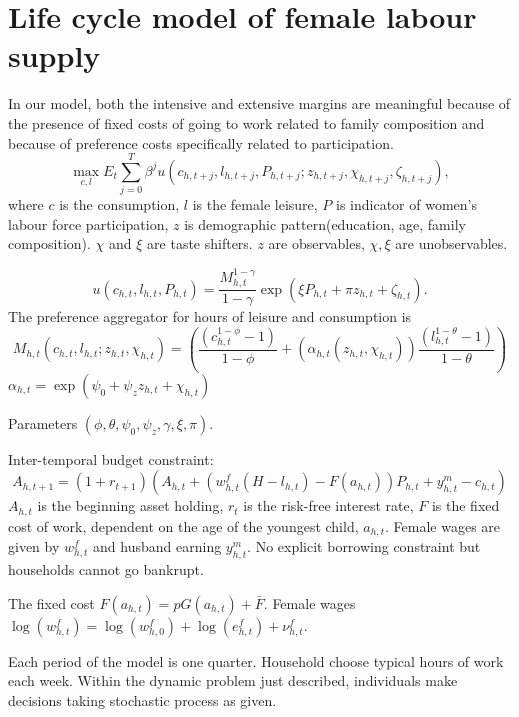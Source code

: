 \section{Life cycle model of female labour supply}
In our model, both the intensive and extensive margins are meaningful because of the presence of fixed costs of going to work related to family composition and because of preference costs specifically related to participation.
\[ \max_{c,l} E_t \sum_{j=0}^T \beta^j u(c_{h,t+j},l_{h,t+j},P_{h,t+j};z_{h,t+j},\chi_{h,t+j},\zeta_{h,t+j}), \]
where $c$ is the consumption, $l$ is the female leisure, $P$ is indicator of women's labour force participation, $z$ is demographic pattern(education, age, family composition). $\chi$ and $\xi$ are taste shifters.
$z$ are observables, $\chi,\xi$ are unobservables.

\[ u(c_{h,t},l_{h,t},P_{h,t}) = \frac{M^{1-\gamma}_{h,t}}{1 - \gamma} \exp{(\xi P_{h,t} + \pi z_{h,t} + \zeta_{h,t} )} .\]
The preference aggregator for hours of leisure and consumption is 
\[ M_{h,t}(c_{h,t},l_{h,t};z_{h,t},\chi_{h,t}) = \left( \frac{(c_{h,t}^{1 - \phi} - 1)}{1 - \phi} + (\alpha_{h,t}(z_{h,t},\chi_{h,t})) \frac{(l_{h,t}^{1 - \theta} -1)}{ 1 - \theta}\right) \]
$\alpha_{h,t}= \exp{(\psi_0 + \psi_z z_{h,t} + \chi_{h,t})}$

Parameters  $(\phi,\theta,\psi_0,\psi_z,\gamma,\xi,\pi)$.

Inter-temporal budget constraint:
\[ A_{h,t+1} = (1 + r_{t+1}) \left( A_{h,t} + \left(w_{h,t}^f(H-l_{h,t}) - F(a_{h,t}) \right)P_{h,t} + y_{h,t}^m - c_{h,t} \right)\]
$A_{h,t}$ is the beginning asset holding, $r_t$ is the risk-free interest rate, $F$ is the fixed cost of work, dependent on the age of the youngest child, $a_{h,t}$. Female wages are given by $w_{h,t}^f$ and husband earning $y_{h,t}^m$.
No explicit borrowing constraint but households cannot go bankrupt.

The fixed cost $F(a_{h,t}) = p G(a_{h,t}) + \bar{F}$.
Female wages $\log(w_{h,t}^f ) = \log(w_{h,0}^f) + \log(e_{h,t}^f) + \nu_{h,t}^f $.

Each period of the model is one quarter. Household choose typical hours of work each week.
Within the dynamic problem just described, individuals make decisions taking stochastic process as given.
